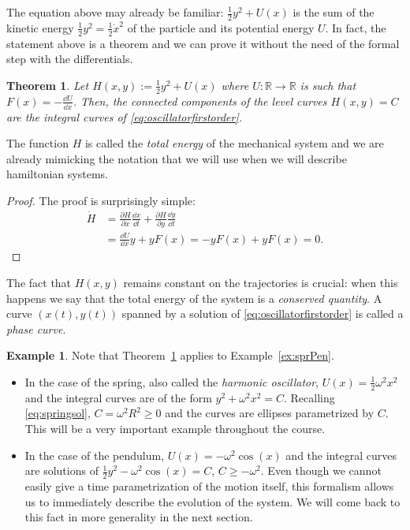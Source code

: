 \documentclass[english,fontsize=11pt,paper=b5]{scrbook}
\newtheorem{theorem}{Theorem}[chapter]
\theoremstyle{definition}
\newtheorem{example}{Example}[chapter]
\begin{document}
    The equation above may already be familiar: $\frac12 y^2 + U(x)$ is the sum of the kinetic energy $\frac12 y^2 = \frac12 {\dot x}^2$ of the particle and its potential energy $U$. In fact, the statement above is a theorem and we can prove it without the need of the formal step with the differentials.

    \begin{theorem}\label{thm:ham1}
      Let $H(x, y) := \frac12 y^2 + U(x)$ where $U:\mathbb{R}\to\mathbb{R}$ is such that $F(x) = -\frac{\dd U}{\dd x}$.
      Then, the connected components of the level curves $H(x,y) = C$ are the integral curves of \eqref{eq:oscillatorfirstorder}.
    \end{theorem}
    The function $H$ is called the \emph{total energy} of the mechanical system and we are already mimicking the notation that we will use when we will describe hamiltonian systems.
    \begin{proof}
      The proof is surprisingly simple:
      \begin{align*}
        \dot H & = \frac{\partial H}{\partial x}\frac{\dd x}{\dd t} + \frac{\partial H}{\partial y}\frac{\dd y}{\dd t} \\
               & = \frac{\dd U}{\dd x} y + y F(x)
               = -y F(x) + y F(x) = 0.
      \end{align*}
    \end{proof}

    The fact that $H(x,y)$ remains constant on the trajectories is crucial: when this happens we say that the total energy of the system is a \emph{conserved quantity}.
    A curve $(x(t), y(t))$ spanned by a solution of \eqref{eq:oscillatorfirstorder} is called a \emph{phase curve}.

    \begin{example}
      Note that Theorem~\ref{thm:ham1} applies to Example~\ref{ex:sprPen}.
      \begin{itemize}
        \item In the case of the spring, also called the \emph{harmonic oscillator}, $U(x) = \frac12 \omega^2 x^2$ and the integral curves are of the form $y^2 + \omega^2 x^2 = C$.
          Recalling \eqref{eq:springsol}, $C = \omega^2 R^2 \geq 0$ and the curves are ellipses parametrized by $C$.
          This will be a very important example throughout the course.
        \item In the case of the pendulum, $U(x) = -\omega^2 \cos(x)$ and the integral curves are solutions of $\frac12 y^2 - \omega^2 \cos(x) = C$, $C \geq -\omega^2$.
          Even though we cannot easily give a time parametrization of the motion itself, this formalism allows us to immediately describe the evolution of the system.
          We will come back to this fact in more generality in the next section.
      \end{itemize}
    \end{example}
\end{document}
